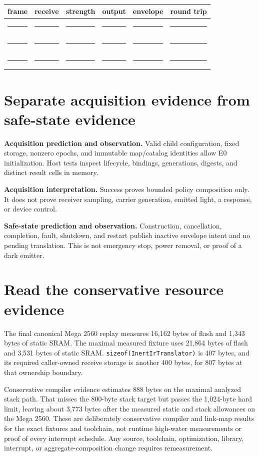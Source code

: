 \documentclass[10pt]{article}
\newcommand{\blankline}{\rule{0.72in}{0.4pt}}
\begin{document}
\begin{tabularx}{\linewidth}{@{}X X X X X X@{}}
\toprule
frame & receive & strength & output & envelope & round trip\\
\midrule
\rule{0pt}{16pt}\blankline & \blankline & \blankline & \blankline & \blankline & \blankline\\[8pt]
\blankline & \blankline & \blankline & \blankline & \blankline & \blankline\\[8pt]
\blankline & \blankline & \blankline & \blankline & \blankline & \blankline\\
\bottomrule
\end{tabularx}

\section{Separate acquisition evidence from safe-state evidence}
\textbf{Acquisition prediction and observation.} Valid child configuration,
fixed storage, nonzero epochs, and immutable map/catalog identities allow E0
initialization. Host tests inspect lifecycle, bindings, generations, digests,
and distinct result cells in memory.

\textbf{Acquisition interpretation.} Success proves bounded policy
composition only. It does not prove receiver sampling, carrier generation,
emitted light, a response, or device control.

\textbf{Safe-state prediction and observation.} Construction, cancellation,
completion, fault, shutdown, and restart publish inactive envelope intent and
no pending translation. This is not emergency stop, power removal, or proof
of a dark emitter.

\section{Read the conservative resource evidence}
The final canonical Mega 2560 replay measures 16,162 bytes of flash and 1,343 bytes
of static SRAM. The maximal measured fixture uses 21,864 bytes of flash and
3,531 bytes of static SRAM. \texttt{sizeof(InertIrTranslator)} is 407 bytes,
and its required caller-owned receive storage is another 400 bytes, for 807
bytes at that ownership boundary.

Conservative compiler evidence estimates 888 bytes on the maximal analyzed
stack path. That misses the 800-byte stack target but passes the 1,024-byte
hard limit, leaving about 3,773 bytes after the measured static and stack
allowances on the Mega 2560. These are deliberately conservative compiler and
link-map results for the exact fixtures and toolchain, not runtime high-water
measurements or proof of every interrupt schedule. Any
source, toolchain, optimization, library, interrupt, or aggregate-composition
change requires remeasurement.
\end{document}
